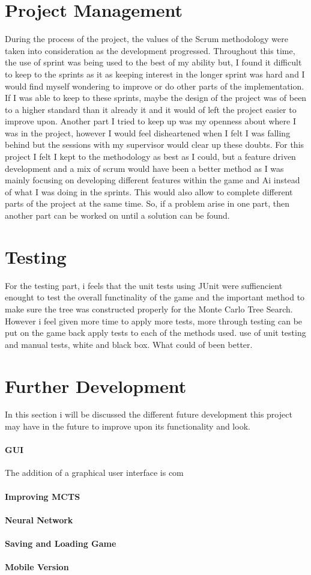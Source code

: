 \section{Project Management}
During the process of the project, the values of the Scrum methodology were taken into consideration as the development progressed. Throughout this time, the use of sprint was being used to the best of my ability but, I found it difficult to keep to the sprints as it as keeping interest in the longer sprint was hard and I would find myself wondering to improve or do other parts of the implementation. If I was able to keep to these sprints, maybe the design of the project was of been to a higher standard than it already it and it would of left the project easier to improve upon. Another part I tried to keep up was my openness about where I was in the project, however I would feel disheartened when I felt I was falling behind but the sessions with my supervisor would clear up these doubts. For this project I felt I kept to the methodology as best as I could, but a feature driven development and a mix of scrum would have been a better method as I was mainly focusing on developing different features within the game and Ai instead of what I was doing in the sprints. This would also allow to complete different parts of the project at the same time. So, if a problem arise in one part, then another part can be worked on until a solution can be found.
\section{Testing}
For the testing part, i feels that the unit tests using JUnit were suffiencient enought to test the overall functinality of the game and the important method to make sure the tree was constructed properly for the Monte Carlo Tree Search. However i feel given more time to apply more tests, more through testing can be put on the game back apply tests to each of the methods used.
use of unit testing and manual tests, white and black box. What could of been better.
\section{Further Development}
In this section i will be discussed the different future development this project may have in the future to improve upon its functionality and look.
\paragraph{GUI}
The addition of a graphical user interface is com

\paragraph{Improving MCTS}

\paragraph{Neural Network}

\paragraph{Saving and Loading Game}

\paragraph{Mobile Version}
